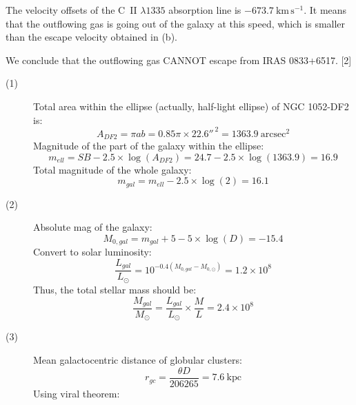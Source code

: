 \begin{description}
  The velocity offsets of the C~II $\lambda 1335$ absorption line is
  $-673.7~\mathrm{km\,s^{-1}}$. It means that the outflowing gas is going out
  of the galaxy at this speed, which is smaller than the escape velocity
  obtained in (b).

  We conclude that the outflowing gas CANNOT escape from
  IRAS 0833+6517. \hfill[2]
\end{description}

\begin{description}
\item[(1)] Total area within the ellipse (actually, half-light ellipse) of
  NGC 1052-DF2 is:
  \begin{equation*}
  A_{DF2} = \pi a b = 0.85\pi \times 22.6''^{\,2}
  = 1363.9~\mathrm{arcsec^2}
  \tag*{(2 points)}
  \end{equation*}
  Magnitude of the part of the galaxy within the ellipse:
  \begin{equation*}
  m_{ell} = SB - 2.5 \times \log(A_{DF2})
  = 24.7 - 2.5 \times \log(1363.9) = 16.9
  \tag*{(2 points)}
  \end{equation*}
  Total magnitude of the whole galaxy:
  \begin{equation*}
  m_{gal} = m_{ell} - 2.5 \times \log(2) = 16.1
  \tag*{(2 points)}
  \end{equation*}
\item[(2)] Absolute mag of the galaxy:
  \begin{equation*}
  M_{0,gal} = m_{gal} + 5 - 5 \times \log(D) = -15.4
  \tag*{(2 points)}
  \end{equation*}
  Convert to solar luminosity:
  \begin{equation*}
  \frac{L_{gal}}{L_\odot} = 10^{-0.4(M_{0,gal} - M_{0,\odot})}
  = 1.2 \times 10^{8}
  \tag*{(2 points)}
  \end{equation*}
  Thus, the total stellar mass should be:
  \begin{equation*}
  \frac{M_{gal}}{M_\odot} = \frac{L_{gal}}{L_\odot} \times \frac{M}{L}
  = 2.4 \times 10^{8}
  \tag*{(2 points)}
  \end{equation*}
\item[(3)] Mean galactocentric distance of globular clusters:
  \begin{equation*}
  r_{gc} = \frac{\theta D}{206265} = 7.6~\mathrm{kpc}
  \tag*{(2 points)}
  \end{equation*}
  Using viral theorem: %

\end{description}
